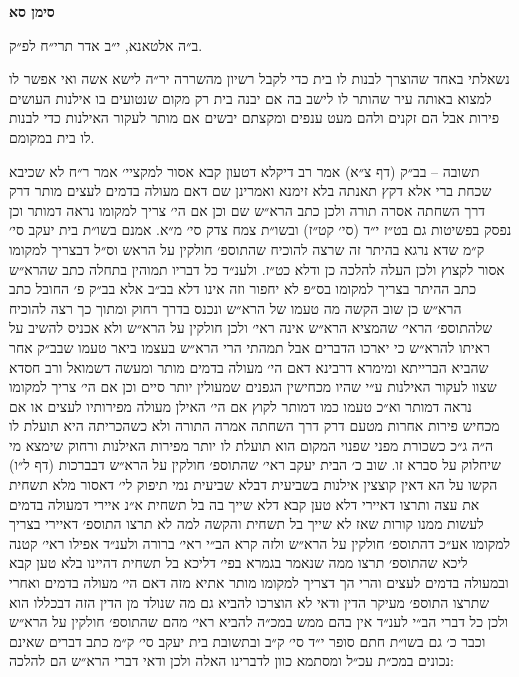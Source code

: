 \documentclass[12pt, openany]{book}
\newcommand{\chapname}{}
\newcommand{\newchap}[1]{
	\addcontentsline{toc}{chapter}{#1}
	\renewcommand{\chapname}{#1}
		\begin{center}
			\textbf{%
\fontsize{16pt}{16pt}\selectfont
				#1}
		\end{center}
}
\begin{document}
\newchap{סימן סא}
\begin{multicols}{2}
ב״ה אלטאנא, י״ב אדר תרי״ח לפ״ק.\\\vspace{0pt}

נשאלתי באחד שהוצרך לבנות לו בית כדי לקבל רשיון מהשררה יר״ה לישא אשה ואי אפשר לו למצוא באותה עיר שהותר לו לישב בה אם יבנה בית רק מקום שנטועים בו אילנות העושים פירות אבל הם זקנים ולהם מעט ענפים ומקצתם יבשים אם מותר לעקור האילנות כדי לבנות לו בית במקומם.\\\vspace{0pt}

תשובה – בב״ק (דף צ״א) אמר רב דיקלא דטעון קבא אסור למקציי׳ אמר ר״ח לא שכיבא שכחת ברי אלא דקץ תאנתה בלא זימנא ואמרינן שם דאם מעולה בדמים לעצים מותר דרק דרך השחתה אסרה תורה ולכן כתב הרא״ש שם וכן אם הי׳ צריך למקומו נראה דמותר וכן נפסק בפשיטות גם בט״ז י״ד (סי׳ קט״ז) ובשו״ת צמח צדק סי׳ מ״א. אמנם בשו״ת בית יעקב סי׳ ק״מ שדא נרגא בהיתר זה שרצה להוכיח שהתוספ׳ חולקין על הראש וס״ל דבצריך למקומו אסור לקצוץ ולכן העלה להלכה כן ודלא כט״ז. ולענ״ד כל דבריו תמוהין בתחלה כתב שהרא״ש כתב ההיתר בצריך למקומו בס״פ לא יחפור וזה אינו דלא בב״ב אלא בב״ק פ׳ החובל כתב הרא״ש כן שוב הקשה מה טעמו של הרא״ש ונכנס בדרך רחוק ומתוך כך רצה להוכיח שלהתוספ׳ הראי׳ שהמציא הרא״ש אינה ראי׳ ולכן חולקין על הרא״ש ולא אכניס להשיב על ראיתו להרא״ש כי יארכו הדברים אבל תמהתי הרי הרא״ש בעצמו ביאר טעמו שבב״ק אחר שהביא הברייתא ומימרא דרבינא דאם הי׳ מעולה בדמים מותר ומעשה דשמואל ורב חסדא שצוו לעקור האילנות ע״י שהיו מכחישין הגפנים שמעולין יותר סיים וכן אם הי׳ צריך למקומו נראה דמותר וא״כ טעמו כמו דמותר לקוץ אם הי׳ האילן מעולה מפירותיו לעצים או אם מכחיש פירות אחרות מטעם דרק דרך השחתה אמרה התורה ולא כשהכריתה היא תועלת לו ה״ה ג״כ כשכורת מפני שפנוי המקום הוא תועלת לו יותר מפירות האילנות ורחוק שימצא מי שיחלוק על סברא זו. שוב כ׳ הבית יעקב ראי׳ שהתוספ׳ חולקין על הרא״ש דבברכות (דף ל״ו) הקשו על הא דאין קוצצין אילנות בשביעית דבלא שביעית נמי תיפוק לי׳ דאסור מלא תשחית את עצה ותרצו דאיירי דלא טען קבא דלא שייך בה בל תשחית א״נ איירי דמעולה בדמים לעשות ממנו קורות שאז לא שייך בל תשחית והקשה למה לא תרצו התוספ׳ דאיירי בצריך למקומו אע״כ דהתוספ׳ חולקין על הרא״ש ולזה קרא הב״י ראי׳ ברורה ולענ״ד אפילו ראי׳ קטנה ליכא שהתוספ׳ תרצו ממה שנאמר בגמרא בפי׳ דליכא בל תשחית דהיינו בלא טען קבא ובמעולה בדמים לעצים והרי הך דצריך למקומו מותר אתיא מזה דאם הי׳ מעולה בדמים ואחרי שתרצו התוספ׳ מעיקר הדין ודאי לא הוצרכו להביא גם מה שנולד מן הדין הזה דבכללו הוא ולכן כל דברי הב״י לענ״ד אין בהם ממש במכ״ה להביא ראי׳ מהם שהתוספ׳ חולקין על הרא״ש וכבר כ׳ גם בשו״ת חתם סופר י״ד סי׳ ק״ב ובתשובת בית יעקב סי׳ ק״מ כתב דברים שאינם נכונים במכ״ת עכ״ל ומסתמא כוון לדברינו האלה ולכן ודאי דברי הרא״ש הם להלכה:\\\vspace{0pt}


\end{multicols}
\end{document}
